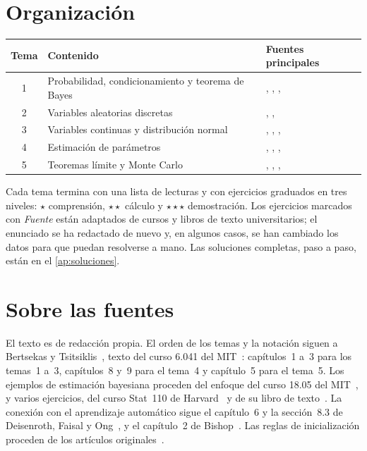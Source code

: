 \documentclass[11pt,a4paper,twoside,openany]{book}
\begin{document}
\section*{Organización}
\begin{center}
\begin{tabular}{@{}cll@{}}
\toprule
Tema & Contenido & Fuentes principales \\
\midrule
1 & Probabilidad, condicionamiento y teorema de Bayes & \cite{bt}, \cite{mit6041}, \cite{mit1805}, \cite{bh} \\
2 & Variables aleatorias discretas & \cite{bt}, \cite{mit6041}, \cite{mml} \\
3 & Variables continuas y distribución normal & \cite{bt}, \cite{bh}, \cite{mml}, \cite{glorot} \\
4 & Estimación de parámetros & \cite{bt}, \cite{mit1805}, \cite{mml}, \cite{bishop} \\
5 & Teoremas límite y Monte Carlo & \cite{bt}, \cite{mit6041}, \cite{bh}, \cite{d2l} \\
\bottomrule
\end{tabular}
\end{center}

Cada tema termina con una lista de lecturas y con ejercicios graduados en tres niveles: $\star$ comprensión, $\star\star$ cálculo y $\star\star\star$ demostración. Los ejercicios marcados con \emph{Fuente} están adaptados de cursos y libros de texto universitarios; el enunciado se ha redactado de nuevo y, en algunos casos, se han cambiado los datos para que puedan resolverse a mano. Las soluciones completas, paso a paso, están en el \cref{ap:soluciones}.

\section*{Sobre las fuentes}
El texto es de redacción propia. El orden de los temas y la notación siguen a Bertsekas y Tsitsiklis~\cite{bt}, texto del curso 6.041 del MIT~\cite{mit6041}: capítulos~1 a~3 para los temas~1 a~3, capítulos~8 y~9 para el tema~4 y capítulo~5 para el tema~5. Los ejemplos de estimación bayesiana proceden del enfoque del curso 18.05 del MIT~\cite{mit1805}, y varios ejercicios, del curso Stat~110 de Harvard~\cite{stat110} y de su libro de texto~\cite{bh}. La conexión con el aprendizaje automático sigue el capítulo~6 y la sección~8.3 de Deisenroth, Faisal y Ong~\cite{mml}, y el capítulo~2 de Bishop~\cite{bishop}. Las reglas de inicialización proceden de los artículos originales~\cite{glorot,he}.
\end{document}
